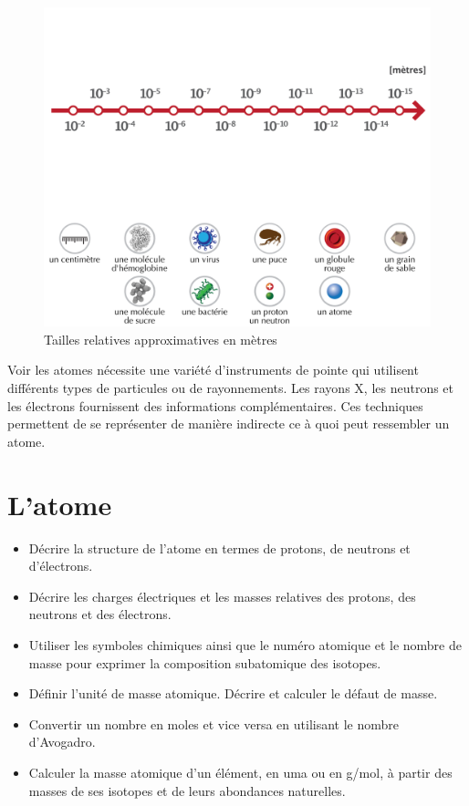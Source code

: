 \documentclass[
  11pt,
  french,
  a4paper,
  openany]{book}
\providecommand{\tightlist}{%
  \setlength{\itemsep}{0pt}\setlength{\parskip}{0pt}}
\begin{document}
\begin{figure}

{\centering \includegraphics[width=1\linewidth]{images/ordre-grandeur-ex} 

}

\caption{Tailles relatives approximatives en mètres}\label{fig:ordre-grandeur-ex}
\end{figure}

Voir les atomes nécessite une variété d'instruments de pointe qui utilisent différents types de particules ou de rayonnements. Les rayons X, les neutrons et les électrons fournissent des informations complémentaires. Ces techniques permettent de se représenter de manière indirecte ce à quoi peut ressembler un atome.

\hypertarget{latome}{%
\chapter{L'atome}\label{latome}}

\begin{objectives}

\begin{itemize}
\tightlist
\item
  Décrire la structure de l'atome en termes de protons, de neutrons et d'électrons.
\item
  Décrire les charges électriques et les masses relatives des protons, des neutrons et des électrons.
\item
  Utiliser les symboles chimiques ainsi que le numéro atomique et le nombre de masse pour exprimer la composition subatomique des isotopes.
\item
  Définir l'unité de masse atomique. Décrire et calculer le défaut de masse.
\item
  Convertir un nombre en moles et vice versa en utilisant le nombre d'Avogadro.
\item
  Calculer la masse atomique d'un élément, en uma ou en g/mol, à partir des masses de ses isotopes et de leurs abondances naturelles.
\end{itemize}


\end{objectives}
\end{document}

